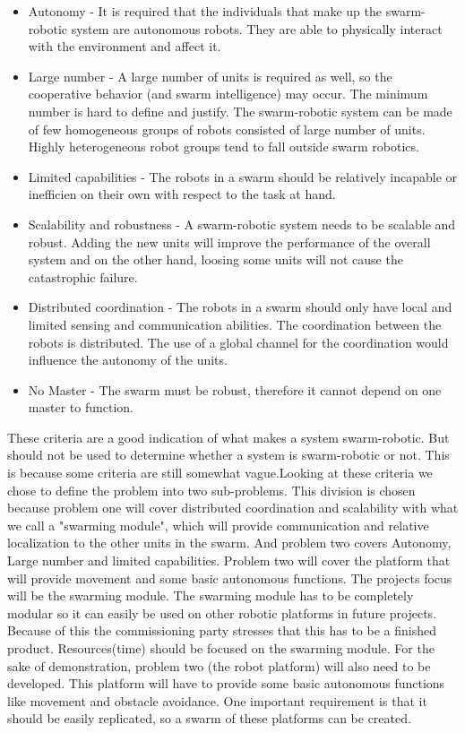 \documentclass[10pt,a4paper]{article}
\begin{document}
\begin{itemize}
	\item Autonomy - It is required that the individuals that make up 	the swarm-robotic system are autonomous robots. They are able to 		physically 		interact with the environment and affect it.
	\item Large number - A large number of units is required
	as well, so the cooperative behavior (and
	swarm intelligence) may occur. The minimum number
	is hard to define and justify. The swarm-robotic
	system can be made of few homogeneous groups of
	robots consisted of large number of units. Highly heterogeneous
	robot groups tend to fall outside swarm
	robotics.
	\item Limited capabilities - The robots in a swarm
	should be relatively incapable or inefficien on their
	own with respect to the task at hand.
	\item Scalability and robustness - A swarm-robotic
	system needs to be scalable and robust. Adding the
	new units will improve the performance of the overall
	system and on the other hand, loosing some units will
	not cause the catastrophic failure.
	\item Distributed coordination - The robots in a swarm
	should only have local and limited sensing and communication
	abilities. The coordination between the
	robots is distributed. The use of a global channel for
	the coordination would influence the autonomy of the
	units.
	\item No Master - The swarm must be robust, therefore it cannot depend on one master to function.
\end{itemize}

These criteria are a good indication of what makes a system swarm-robotic. But should not be used to determine whether a system is swarm-robotic or not. This is because some criteria are still somewhat vague\cite{swarmintelligence}.Looking at these criteria we chose to define the problem into two sub-problems. This division is chosen because problem one will cover distributed coordination and scalability with what we call a "swarming module", which will provide communication and relative localization to the other units in the swarm. And problem two covers Autonomy, Large number and limited capabilities.  Problem two will cover the platform that will provide movement and some basic autonomous functions. The projects focus will be the swarming module. The swarming module has to be completely modular so it can easily be used on other robotic platforms in future projects. Because of this the commissioning party stresses that this has to be a finished product. Resources(time) should be focused on the swarming module. For the sake of demonstration, problem two (the robot platform) will also need to be developed. This platform will have to provide some basic autonomous functions like movement and obstacle avoidance. One important requirement is that it should be easily replicated, so a swarm of these platforms can be created.\\
\end{document}
